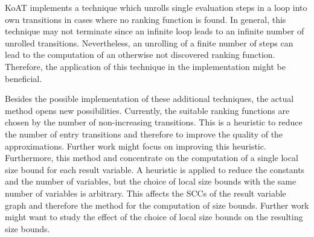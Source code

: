KoAT \cite{koat} implements a technique which unrolls single evaluation steps in a loop into own transitions in cases where no ranking function is found.
In general, this technique may not terminate since an infinite loop leads to an infinite number of unrolled transitions.
Nevertheless, an unrolling of a finite number of steps can lead to the computation of an otherwise not discovered ranking function.
Therefore, the application of this technique in the implementation might be beneficial.

Besides the possible implementation of these additional techniques, the actual method opens new possibilities.
Currently, the suitable ranking functions are chosen by the number of non-increasing transitions.
This is a heuristic to reduce the number of entry transitions and therefore to improve the quality of the approximations.
Further work might focus on improving this heuristic.
Furthermore, this method and \cite{koat} concentrate on the computation of a single local size bound for each result variable.
A heuristic is applied to reduce the constants and the number of variables, but the choice of local size bounds with the same number of variables is arbitrary.
This affects the SCCs of the result variable graph and therefore the method for the computation of size bounds.
Further work might want to study the effect of the choice of local size bounds on the resulting size bounds.
